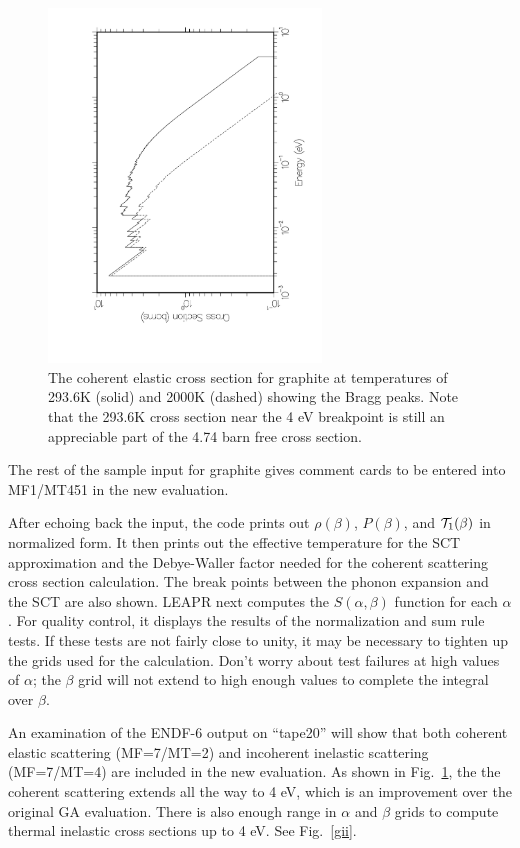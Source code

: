 \begin{figure}[b]\centering
\includegraphics[keepaspectratio, height=3.7in, angle=270]{figs/leceack}
\caption[Coherent elastic scattering cross section for graphite]
{The coherent elastic cross section for graphite at temperatures of
 293.6K (solid) and 2000K (dashed) showing the Bragg peaks.  Note
 that the 293.6K cross section near the 4 eV breakpoint is still an
 appreciable part of the 4.74 barn free cross section.}
\label{gce}
\end{figure}

The rest of the sample input for graphite gives comment cards
to be entered into MF1/MT451 in the new evaluation.

After echoing back the input, the code prints out
$\rho(\beta)$, $P(\beta)$, and ${\cal T}_1(\beta)$ in normalized
form.  It then prints out the effective temperature for the SCT
approximation and the Debye-Waller factor needed for the coherent
scattering cross section calculation.  The break points between the
phonon expansion and the SCT are also shown.  LEAPR next computes the
$S(\alpha,\beta)$ function for each $\alpha$.  For quality control, it
displays the results of the normalization and sum rule tests.  If these
tests are not fairly close to unity, it may be necessary to tighten up
the grids used for the calculation.  Don't worry about test failures at
high values of $\alpha$; the $\beta$ grid will not extend to high enough
values to complete the integral over $\beta$.

An examination of the ENDF-6 output on ``tape20'' will show that both
coherent elastic scattering (MF=7/MT=2) and incoherent inelastic
scattering (MF=7/MT=4) are included in the new evaluation.  As shown
in Fig.~\ref{gce}, the the coherent scattering extends all the
way to 4 eV, which is an improvement over the original GA evaluation.
There is also enough range in $\alpha$ and $\beta$ grids to compute
thermal inelastic cross sections up to 4 eV.  See Fig.~\ref{gii}.

